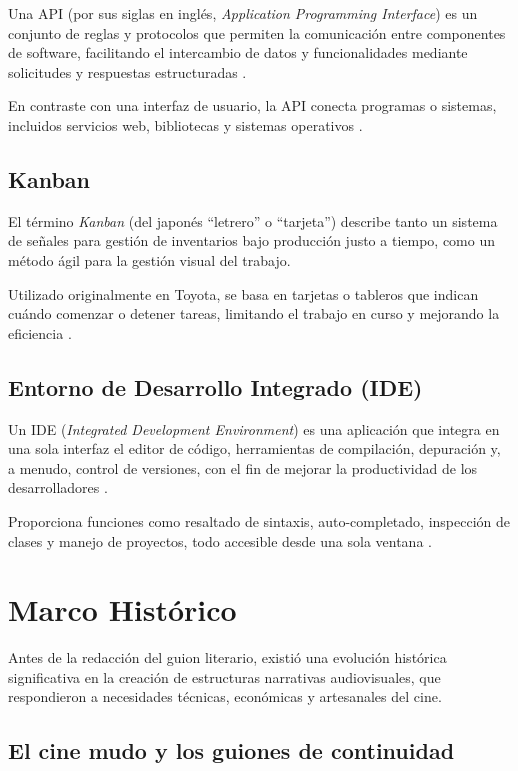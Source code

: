 \documentclass[12pt]{article}
\begin{document}
	Una API (por sus siglas en inglés, \emph{Application Programming Interface}) es un conjunto de reglas y protocolos que permiten la comunicación entre componentes de software, facilitando el intercambio de datos y funcionalidades mediante solicitudes y respuestas estructuradas \parencite{aws_api,oracle_api}.

	En contraste con una interfaz de usuario, la API conecta programas o sistemas, incluidos servicios web, bibliotecas y sistemas operativos \parencite{wikipedia_api}.

	\subsection{Kanban}

	El término \emph{Kanban} (del japonés “letrero” o “tarjeta”) describe tanto un sistema de señales para gestión de inventarios bajo producción justo a tiempo, como un método ágil para la gestión visual del trabajo.

	Utilizado originalmente en Toyota, se basa en tarjetas o tableros que indican cuándo comenzar o detener tareas, limitando el trabajo en curso y mejorando la eficiencia \parencite{wikipedia_kanban_dev,asana_kanban}.

	\subsection{Entorno de Desarrollo Integrado (IDE)}

	Un IDE (\emph{Integrated Development Environment}) es una aplicación que integra en una sola interfaz el editor de código, herramientas de compilación, depuración y, a menudo, control de versiones, con el fin de mejorar la productividad de los desarrolladores \parencite{eswiki_ide,geeksforgeeks_ide}.

	Proporciona funciones como resaltado de sintaxis, auto-completado, inspección de clases y manejo de proyectos, todo accesible desde una sola ventana \parencite{eswiki_ide}.

	\section{Marco Histórico}

	Antes de la redacción del guion literario, existió una evolución histórica significativa en la creación de estructuras narrativas audiovisuales, que respondieron a necesidades técnicas, económicas y artesanales del cine.

	\subsection{El cine mudo y los guiones de continuidad}
\end{document}
